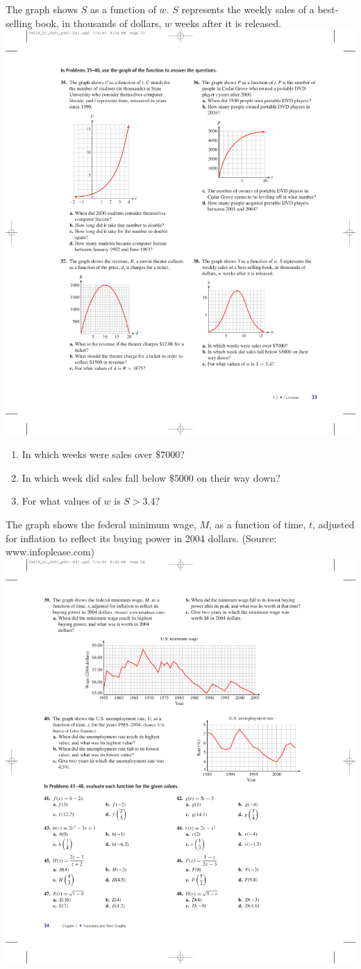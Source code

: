 \documentclass[10pt,]{book}
\theoremstyle{plain}
\theoremstyle{definition}
\theoremstyle{definition}
\theoremstyle{definition}
\newcommand{\gt}{>}
\begin{document}
\begin{exerciselist}
\begin{exercisegroup}
\begin{enumerate}[label=\alph*]
\end{enumerate}
%
\exercise[38.]\hypertarget{exercise-48}{}The graph shows \(S\) as a function of \(w\). \(S\) represents the weekly sales of a best-selling book, in thousands of dollars, \(w\) weeks after it is released.%
\includegraphics[width=0.5\linewidth]{images/fig-ex-1-2-38}
\leavevmode%
\begin{enumerate}[label=\alph*]
\item\hypertarget{li-135}{}In which weeks were sales over \(\$7000\)?%
\item\hypertarget{li-136}{}In which week did sales fall below \(\$5000\) on their way down?%
\item\hypertarget{li-137}{}For what values of \(w\) is \(S\gt 3.4\)?%
\end{enumerate}
\exercise[39.]\hypertarget{exercise-49}{}The graph shows the federal minimum wage, \(M\), as a function of time, \(t\), adjusted for inflation to reflect its buying power in 2004 dollars. (Source: www.infoplease.com) \includegraphics[width=1\linewidth]{images/fig-ex-1-2-39}

\end{exercisegroup}
\end{exerciselist}
\end{document}
